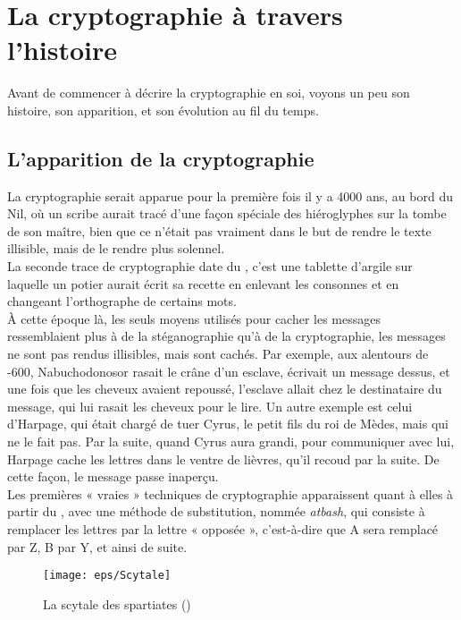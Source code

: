 \chapter{La cryptographie à travers l'histoire}
Avant de commencer à décrire la cryptographie en soi, voyons un peu
son histoire, son apparition, et son évolution au fil du temps.

\section{L'apparition de la cryptographie}
La cryptographie serait apparue pour la première fois il y a 4000 ans,
au bord du Nil, où un scribe aurait tracé d'une façon spéciale des
hiéroglyphes sur la tombe de son maître, bien que ce n'était pas
vraiment dans le but de rendre le texte illisible, mais de le rendre
plus solennel. \\

La seconde trace de cryptographie date du , c'est une tablette
d'argile sur laquelle un potier aurait écrit sa recette en enlevant
les consonnes et en changeant l'orthographe de certains mots. \\

À cette époque là, les seuls moyens utilisés pour cacher les messages
ressemblaient plus à de la stéganographie qu'à de la cryptographie,
les messages ne sont pas rendus illisibles, mais sont cachés. Par
exemple, aux alentours de -600, Nabuchodonosor rasait le crâne d'un
esclave, écrivait un message dessus, et une fois que les cheveux
avaient repoussé, l'esclave allait chez le destinataire du message,
qui lui rasait les cheveux pour le lire. Un autre exemple est celui
d'Harpage, qui était chargé de tuer Cyrus, le petit fils du roi de
Mèdes, mais qui ne le fait pas. Par la suite, quand Cyrus aura
grandi, pour communiquer avec lui, Harpage cache les lettres dans le
ventre de lièvres, qu'il recoud par la suite. De cette façon, le
message passe
inaperçu. \\

Les premières « vraies » techniques de cryptographie apparaissent
quant à elles à partir du , avec une méthode de substitution,
nommée \emph{atbash}, qui consiste à remplacer les lettres par la
lettre « opposée », c'est-à-dire que A sera remplacé par Z, B par Y,
et ainsi de suite. \\

\begin{figure}[h]
  \begin{center}
    \texttt{[image: eps/Scytale]}
  \end{center}
  \caption{La scytale des spartiates ()}
  \label{fig:Scytale}
\end{figure}
  
